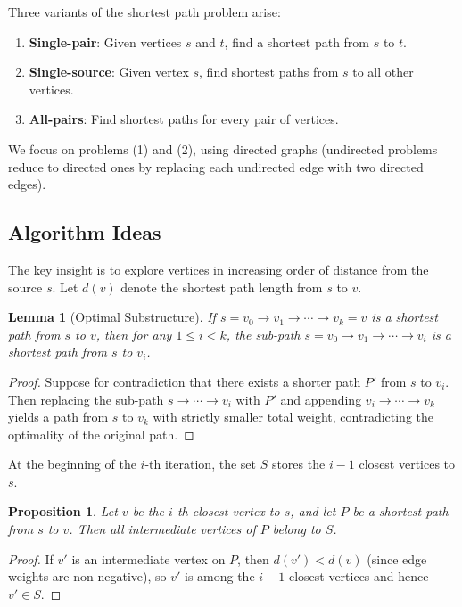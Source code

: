 \documentclass[11pt, a4paper, notitlepage]{report}
\newtheorem{lemma}[theorem]{Lemma}
\newtheorem{proposition}[theorem]{Proposition}
\theoremstyle{definition}
\theoremstyle{remark}
\begin{document}
Three variants of the shortest path problem arise:
\begin{enumerate}
  \item \textbf{Single-pair}: Given vertices $s$ and $t$, find a shortest path from $s$ to $t$.
  \item \textbf{Single-source}: Given vertex $s$, find shortest paths from $s$ to all other vertices.
  \item \textbf{All-pairs}: Find shortest paths for every pair of vertices.
\end{enumerate}
We focus on problems (1) and (2), using directed graphs (undirected problems reduce to directed ones by replacing each undirected edge with two directed edges).

\subsection{Algorithm Ideas}
\label{subsec:sp-ideas}

The key insight is to explore vertices in increasing order of distance from the source $s$. Let $d(v)$ denote the shortest path length from $s$ to $v$.

\begin{lemma}[Optimal Substructure]
\label{lem:optimal-substructure}
If $s = v_0 \to v_1 \to \cdots \to v_k = v$ is a shortest path from $s$ to $v$, then for any $1 \le i < k$, the sub-path $s = v_0 \to v_1 \to \cdots \to v_i$ is a shortest path from $s$ to $v_i$.
\end{lemma}

\begin{proof}
Suppose for contradiction that there exists a shorter path $P'$ from $s$ to $v_i$. Then replacing the sub-path $s \to \cdots \to v_i$ with $P'$ and appending $v_i \to \cdots \to v_k$ yields a path from $s$ to $v_k$ with strictly smaller total weight, contradicting the optimality of the original path.
\end{proof}

At the beginning of the $i$-th iteration, the set $S$ stores the $i-1$ closest vertices to $s$.

\begin{proposition}
\label{prop:next-closest}
Let $v$ be the $i$-th closest vertex to $s$, and let $P$ be a shortest path from $s$ to $v$. Then all intermediate vertices of $P$ belong to $S$.
\end{proposition}

\begin{proof}
If $v'$ is an intermediate vertex on $P$, then $d(v') < d(v)$ (since edge weights are non-negative), so $v'$ is among the $i-1$ closest vertices and hence $v' \in S$.
\end{proof}
\end{document}
